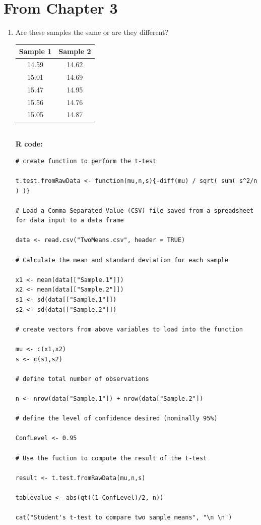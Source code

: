 \section{From Chapter 3}
\begin{enumerate}
	\item Are these samples the same or are they different?
	
	\begin{tabular}{|c|c|}
		\hline \textbf{Sample 1} & \textbf{Sample 2} \\ 
		\hline 14.59 & 14.62 \\ 
		\hline 15.01 & 14.69 \\ 
		\hline 15.47 & 14.95 \\ 
		\hline 15.56 & 14.76 \\ 
		\hline 15.05 & 14.87 \\ 
		\hline 
		
	\end{tabular}\\
\newpage
\textbf{R code:}

\begin{lstlisting}
# create function to perform the t-test

t.test.fromRawData <- function(mu,n,s){-diff(mu) / sqrt( sum( s^2/n ) )}

# Load a Comma Separated Value (CSV) file saved from a spreadsheet for data input to a data frame

data <- read.csv("TwoMeans.csv", header = TRUE)

# Calculate the mean and standard deviation for each sample

x1 <- mean(data[["Sample.1"]])
x2 <- mean(data[["Sample.2"]])
s1 <- sd(data[["Sample.1"]])
s2 <- sd(data[["Sample.2"]])

# create vectors from above variables to load into the function

mu <- c(x1,x2)
s <- c(s1,s2)

# define total number of observations

n <- nrow(data["Sample.1"]) + nrow(data["Sample.2"])

# define the level of confidence desired (nominally 95%)

ConfLevel <- 0.95

# Use the fuction to compute the result of the t-test

result <- t.test.fromRawData(mu,n,s)

tablevalue <- abs(qt((1-ConfLevel)/2, n))

cat("Student's t-test to compare two sample means", "\n \n")
	

\end{lstlisting}
\end{enumerate}
